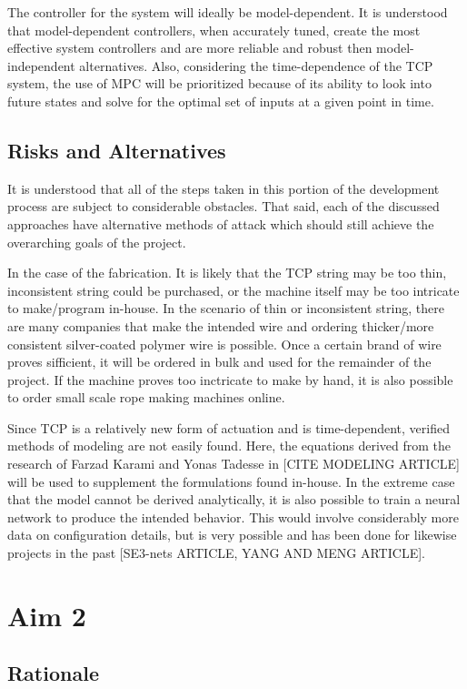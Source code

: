 The controller for the system will ideally be model-dependent. It is understood that model-dependent controllers, when accurately tuned, create the most effective system controllers and are more reliable and robust then model-independent alternatives. Also, considering the time-dependence of the TCP system, the use of MPC will be prioritized because of its ability to look into future states and solve for the optimal set of inputs at a given point in time.

\subsection{Risks and Alternatives}

It is understood that all of the steps taken in this portion of the development process are subject to considerable obstacles. That said, each of the discussed approaches have alternative methods of attack which should still achieve the overarching goals of the project.

In the case of the fabrication. It is likely that the TCP string may be too thin, inconsistent string could be purchased, or the machine itself may be too intricate to make/program in-house. In the scenario of thin or inconsistent string, there are many companies that make the intended wire and ordering thicker/more consistent silver-coated polymer wire is possible. Once a certain brand of wire proves sifficient, it will be ordered in bulk and used for the remainder of the project. If the machine proves too inctricate to make by hand, it is also possible to order small scale rope making machines online.

Since TCP is a relatively new form of actuation and is time-dependent, verified methods of modeling are not easily found. Here, the equations derived from the research of Farzad Karami and Yonas Tadesse in [CITE MODELING ARTICLE] will be used to supplement the formulations found in-house. In the extreme case that the model cannot be derived analytically, it is also possible to train a neural network to produce the intended behavior. This would involve considerably more data on configuration details, but is very possible and has been done for likewise projects in the past [SE3-nets ARTICLE, YANG AND MENG ARTICLE].

\section{Aim 2}

\subsection{Rationale}

